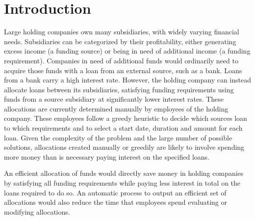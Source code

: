 \documentclass{sig-alternate}
\begin{document}

\section{Introduction}\label{sec:intro}
Large holding companies own many subsidiaries, with widely varying financial needs. Subsidiaries can be categorized by their profitability, either generating excess income (a funding source) or being in need of additional income (a funding requirement). Companies in need of additional funds would ordinarily need to acquire those funds with a loan from an external source, such as a bank. Loans from a bank carry a high interest rate. However, the holding company can instead allocate loans between its subsidiaries, satisfying funding requirements using funds from a source subsidiary at significantly lower interest rates. These allocations are currently determined manually by employees of the holding company. These employees follow a greedy heuristic to decide which sources loan to which requirements and to select a start date, duration and amount for each loan. Given the complexity of the problem and the large number of possible solutions, allocations created manually or greedily are likely to involve spending more money than is necessary paying interest on the specified loans.

An efficient allocation of funds would directly save money in holding companies by satisfying all funding requirements while paying less interest in total on the loans required to do so. An automatic process to output an efficient set of allocations would also reduce the time that employees spend evaluating or modifying allocations.
\end{document}
